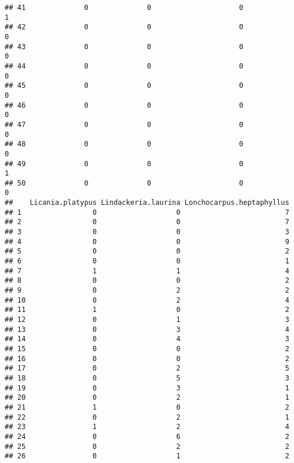\documentclass[
]{article}
\begin{document}
\begin{verbatim}
## 41              0              0                     0                 1
## 42              0              0                     0                 0
## 43              0              0                     0                 0
## 44              0              0                     0                 0
## 45              0              0                     0                 0
## 46              0              0                     0                 0
## 47              0              0                     0                 0
## 48              0              0                     0                 0
## 49              0              0                     0                 1
## 50              0              0                     0                 0
##    Licania.platypus Lindackeria.laurina Lonchocarpus.heptaphyllus
## 1                 0                   0                         7
## 2                 0                   0                         7
## 3                 0                   0                         3
## 4                 0                   0                         9
## 5                 0                   0                         2
## 6                 0                   0                         1
## 7                 1                   1                         4
## 8                 0                   0                         2
## 9                 0                   2                         2
## 10                0                   2                         4
## 11                1                   0                         2
## 12                0                   1                         3
## 13                0                   3                         4
## 14                0                   4                         3
## 15                0                   0                         2
## 16                0                   0                         2
## 17                0                   2                         5
## 18                0                   5                         3
## 19                0                   3                         1
## 20                0                   2                         1
## 21                1                   0                         2
## 22                0                   2                         1
## 23                1                   2                         4
## 24                0                   6                         2
## 25                0                   2                         2
## 26                0                   1                         2

\end{verbatim}
\end{document}
